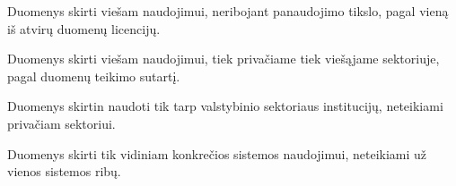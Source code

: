 \documentclass[letterpaper,10pt,lithuanian]{sphinxmanual}
\begin{document}
\begin{fulllineitems}
\label{\detokenize{prieiga:id0}}
\pysigstartsignatures
\pysigline
{}
\pysigstopsignatures{}

\begin{fulllineitems}
\label{\detokenize{prieiga:open}}
\pysigstartsignatures
\pysigline
{}
\pysigstopsignatures
\sphinxAtStartPar
{}

\sphinxAtStartPar
Duomenys skirti viešam naudojimui, neribojant panaudojimo tikslo, pagal
vieną iš atvirų duomenų licencijų.

\end{fulllineitems}


\begin{fulllineitems}
\label{\detokenize{prieiga:public}}
\pysigstartsignatures
\pysigline
{}
\pysigstopsignatures
\sphinxAtStartPar
{}

\sphinxAtStartPar
Duomenys skirti viešam naudojimui, tiek privačiame tiek viešąjame
sektoriuje, pagal duomenų teikimo sutartį.

\end{fulllineitems}


\begin{fulllineitems}
\label{\detokenize{prieiga:protected}}
\pysigstartsignatures
\pysigline
{}
\pysigstopsignatures
\sphinxAtStartPar
{}

\sphinxAtStartPar
Duomenys skirtin naudoti tik tarp valstybinio sektoriaus institucijų,
neteikiami privačiam sektoriui.

\end{fulllineitems}


\begin{fulllineitems}
\label{\detokenize{prieiga:private}}
\pysigstartsignatures
\pysigline
{}
\pysigstopsignatures
\sphinxAtStartPar
{}

\sphinxAtStartPar
Duomenys skirti tik vidiniam konkrečios sistemos naudojimui, neteikiami
už vienos sistemos ribų.

\end{fulllineitems}


\end{fulllineitems}
\end{document}
